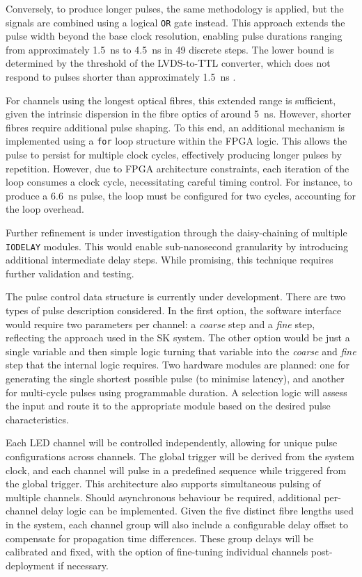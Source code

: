 \documentclass[a4paper,11pt]{article}
\begin{document}
Conversely, to produce longer pulses, the same methodology is applied, but the signals are combined using a logical \texttt{OR} gate instead. This approach extends the pulse width beyond the base clock resolution, enabling pulse durations ranging from approximately \SI{1.5}{\nano\second} to \SI{4.5}{\nano\second} in 49 discrete steps. The lower bound is determined by the threshold of the LVDS-to-TTL converter, which does not respond to pulses shorter than approximately \SI{1.5}{\nano\second} .

For channels using the longest optical fibres, this extended range is sufficient, given the intrinsic dispersion in the fibre optics of around \SI{5}{\nano\second}. However, shorter fibres require additional pulse shaping. To this end, an additional mechanism is implemented using a \texttt{for} loop structure within the FPGA logic. This allows the pulse to persist for multiple clock cycles, effectively producing longer pulses by repetition. However, due to FPGA architecture constraints, each iteration of the loop consumes a clock cycle, necessitating careful timing control. For instance, to produce a \SI{6.6}{\nano\second} pulse, the loop must be configured for two cycles, accounting for the loop overhead.

Further refinement is under investigation through the daisy-chaining of multiple \texttt{IODELAY} modules. This would enable sub-nanosecond granularity by introducing additional intermediate delay steps. While promising, this technique requires further validation and testing.

The pulse control data structure is currently under development. There are two types of pulse description considered. In the first option, the software interface would require two parameters per channel: a \textit{coarse} step and a \textit{fine} step, reflecting the approach used in the SK system. The other option would be just a single variable and then simple logic turning that variable into the \textit{coarse} and \textit{fine} step that the internal logic requires. Two hardware modules are planned: one for generating the single shortest possible pulse (to minimise latency), and another for multi-cycle pulses using programmable duration. A selection logic will assess the input and route it to the appropriate module based on the desired pulse characteristics.

Each LED channel will be controlled independently, allowing for unique pulse configurations across channels. The global trigger will be derived from the system clock, and each channel will pulse in a predefined sequence while triggered from the global trigger. This architecture also supports simultaneous pulsing of multiple channels. Should asynchronous behaviour be required, additional per-channel delay logic can be implemented. Given the five distinct fibre lengths used in the system, each channel group will also include a configurable delay offset to compensate for propagation time differences. These group delays will be calibrated and fixed, with the option of fine-tuning individual channels post-deployment if necessary.
\end{document}
